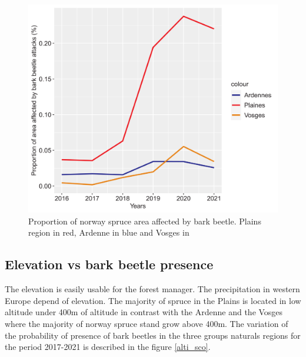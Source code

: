 \documentclass[3p,procedia]{elsarticle}
\begin{document}
\begin{figure}
   \centering
   \includegraphics[width=\textwidth]{Annual_evol_Ardennes_vosges_plaines.png}
    \caption{Proportion of norway spruce area affected by bark beetle. Plains region in red, Ardenne in blue and Vosges in }
    \label{evol_gen}
\end{figure}

    


\subsection{ Elevation vs bark beetle presence}
The elevation is easily usable for the forest manager.
The precipitation in western Europe depend of elevation. 
The majority of spruce in the Plains is located in low altitude under 400m of altitude in contrast with the Ardenne and the Vosges where the majority of norway spruce stand grow above 400m. 
The variation of the probability of presence of bark beetles in the three groups naturals regions for the period 2017-2021 is described in the figure \ref{alti_sco}.
\end{document}

